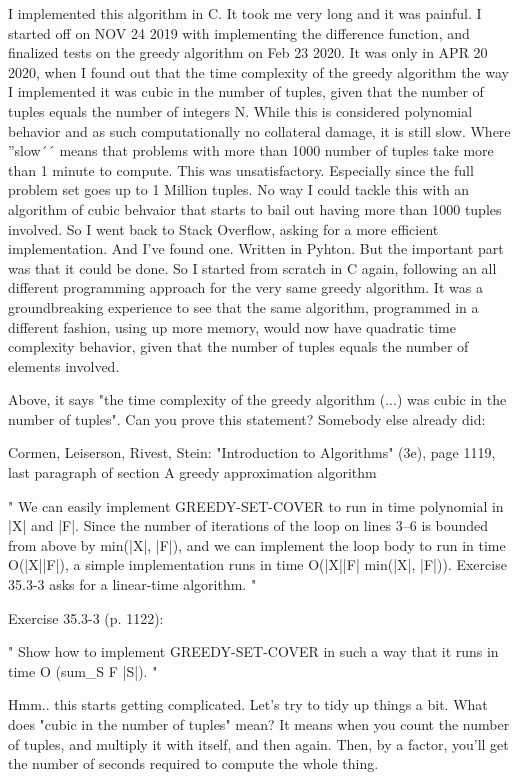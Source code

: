 I implemented this algorithm in C. 
It took me very long and it was painful.
I started off on NOV 24 2019 with implementing the difference function, and finalized tests on the greedy algorithm on Feb 23 2020.
It was only in APR 20 2020, when I found out that the time complexity of the greedy algorithm the way I implemented it was cubic in the number of tuples, given that the number of tuples equals the number of integers N.
While this is considered polynomial behavior and as such computationally no collateral damage, it is still slow.
Where ''slow´´ means that problems with more than 1000 number of tuples take more than 1 minute to compute.
This was unsatisfactory.
Especially since the full problem set goes up to 1 Million tuples.
No way I could tackle this with an algorithm of cubic behvaior that starts to bail out having more than 1000 tuples involved.
So I went back to Stack Overflow, asking for a more efficient implementation.
And I've found one.
Written in Pyhton.
But the important part was that it could be done.
So I started from scratch in C again, following an all different programming approach for the very same greedy algorithm.
It was a groundbreaking experience to see that the same algorithm, programmed in a different fashion, using up more memory, would now have quadratic time complexity behavior, given that the number of tuples equals the number of elements involved.

Above, it says "the time complexity of the greedy algorithm (...) was cubic in the number of tuples".
Can you prove this statement?
Somebody else already did:

Cormen, Leiserson, Rivest, Stein: "Introduction to Algorithms" (3e), page 1119, last paragraph of section A greedy approximation algorithm

"
We can easily implement GREEDY-SET-COVER to run in time polynomial in |X|
and |F|. Since the number of iterations of the loop on lines 3–6 is bounded from
above by min(|X|, |F|), and we can implement the loop body to run in time
O(|X||F|), a simple implementation runs in time O(|X||F| min(|X|, |F|)). Exercise
35.3-3 asks for a linear-time algorithm.
"

Exercise 35.3-3 (p. 1122):

"
Show how to implement GREEDY-SET-COVER in such a way that it runs in time O (sum_{S \in F} |S|).
"

Hmm..
this starts getting complicated.
Let's try to tidy up things a bit.
What does "cubic in the number of tuples" mean?
It means when you count the number of tuples, and multiply it with itself, and then again.
Then, by a factor, you'll get the number of seconds required to compute the whole thing.

